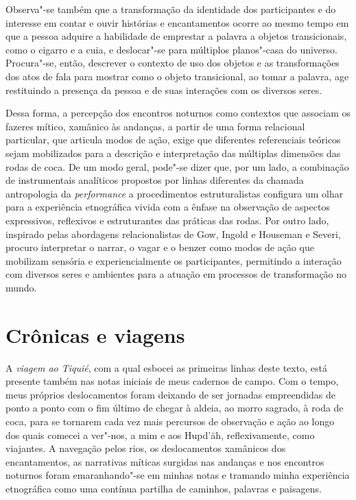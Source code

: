 Observa"-se também que a transformação da identidade dos participantes e
do interesse em contar e ouvir histórias e encantamentos ocorre ao mesmo
tempo em que a pessoa adquire a habilidade de emprestar a palavra a
objetos transicionais, como o cigarro e a cuia, e deslocar"-se para
múltiplos planos"-casa do universo. Procura"-se, então, descrever o
contexto de uso dos objetos e as transformações dos atos de fala para
mostrar como o objeto transicional, ao tomar a palavra, age restituindo
a presença da pessoa e de suas interações com os diversos seres.

Dessa forma, a percepção dos encontros noturnos como contextos que
associam os fazeres mítico, xamânico às andanças, a partir de uma forma
relacional particular, que articula modos de ação, exige que diferentes
referenciais teóricos sejam mobilizados para a descrição e interpretação
das múltiplas dimensões das rodas de coca. De um modo geral, pode"-se
dizer que, por um lado, a combinação de instrumentais analíticos
propostos por linhas diferentes da chamada antropologia da
\textit{performance} a procedimentos estruturalistas configura um olhar
para a experiência etnográfica vivida com a ênfase na observação de
aspectos expressivos, reflexivos e estruturantes das práticas das rodas.
Por outro lado, inspirado pelas abordagens relacionalistas de Gow,
Ingold e Houseman e Severi, procuro interpretar o narrar, o vagar e o
benzer como modos de ação que mobilizam sensória e experiencialmente os
participantes, permitindo a interação com diversos seres e ambientes
para a atuação em processos de transformação no mundo.

\section{Crônicas e viagens}\label{cruxf4nicas-e-viagens}

A \textit{viagem ao Tiquié}, com a qual esbocei as primeiras linhas deste
texto, está presente também nas notas iniciais de meus cadernos de
campo. Com o tempo, meus próprios deslocamentos foram deixando de ser
jornadas empreendidas de ponto a ponto com o fim último de chegar à
aldeia, ao morro sagrado, à roda de coca, para se tornarem cada vez mais
percursos de observação e ação ao longo dos quais comecei a ver"-nos, a
mim e aos Hupd'äh, reflexivamente, como viajantes. A navegação pelos
rios, os deslocamentos xamânicos dos encantamentos, as narrativas
míticas surgidas nas andanças e nos encontros noturnos foram
emaranhando"-se em minhas notas e tramando minha experiência etnográfica
como uma contínua partilha de caminhos, palavras e paisagens.

